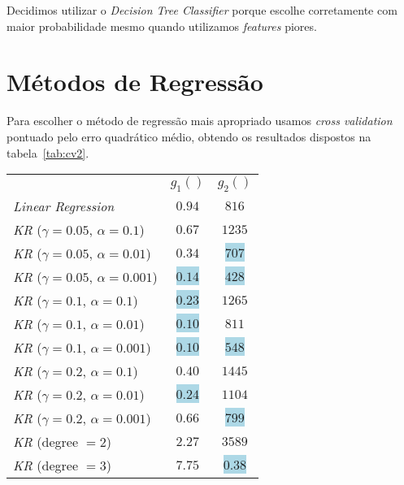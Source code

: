 \documentclass[a4paper,twocolumn]{article}
\begin{document}
    Decidimos utilizar o \textit{Decision Tree Classifier} porque escolhe corretamente com maior probabilidade mesmo quando
    utilizamos \textit{features} piores.

    \section{Métodos de Regressão}
    Para escolher o método de regressão mais apropriado usamos \textit{cross validation} pontuado pelo erro quadrático
    médio, obtendo os resultados dispostos na tabela~\ref{tab:cv2}.

    \begin{table}[ht]
        \centering
        \begin{tabular}{ l c c }
            & $g_1()$ & $g_2()$ \\
         \textit{Linear Regression}                                      & $0.94$ & $816$ \\
         \textit{KR\footnotemark[1]} ($\gamma = 0.05$, $\alpha = 0.1$)   & $0.67$ & $1235$ \\
         \textit{KR\footnotemark[1]} ($\gamma = 0.05$, $\alpha = 0.01$)  & $0.34$ & \colorbox{lightblue}{$707$} \\
         \textit{KR\footnotemark[1]} ($\gamma = 0.05$, $\alpha = 0.001$) & \colorbox{lightblue}{$0.14$} & \colorbox{lightblue}{$428$} \\
         \textit{KR\footnotemark[1]} ($\gamma = 0.1$,  $\alpha = 0.1$)   & \colorbox{lightblue}{$0.23$} & $1265$ \\
         \textit{KR\footnotemark[1]} ($\gamma = 0.1$,  $\alpha = 0.01$)  & \colorbox{lightblue}{$0.10$} & $811$ \\
         \textit{KR\footnotemark[1]} ($\gamma = 0.1$,  $\alpha = 0.001$) & \colorbox{lightblue}{$0.10$} & \colorbox{lightblue}{$548$} \\
         \textit{KR\footnotemark[1]} ($\gamma = 0.2$,  $\alpha = 0.1$)   & $0.40$ & $1445$ \\
         \textit{KR\footnotemark[1]} ($\gamma = 0.2$,  $\alpha = 0.01$)  & \colorbox{lightblue}{$0.24$} & $1104$ \\
         \textit{KR\footnotemark[1]} ($\gamma = 0.2$,  $\alpha = 0.001$) & $0.66$ & \colorbox{lightblue}{$799$} \\
         \textit{KR\footnotemark[2]} (degree $= 2$)                      & $2.27$ & $3589$ \\
         \textit{KR\footnotemark[2]} (degree $= 3$)                      & $7.75$ & \colorbox{lightblue}{$0.38$} \\

\end{tabular}
\end{table}
\end{document}
